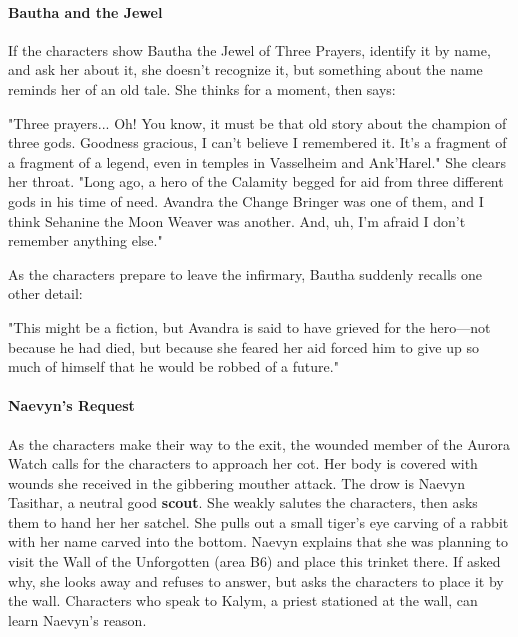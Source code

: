 \documentclass[10pt,a4,twoside,twocolumn,openany,nodeprecatedcode]{dndbook}
\begin{document}
\paragraph{Bautha and the Jewel}
If the characters show Bautha the Jewel of Three Prayers, identify it by name, and ask her about it, she doesn't recognize it, but something about the name reminds her of an old tale. She thinks for a moment, then says:
\begin{DndReadAloud}{}
"Three prayers... Oh! You know, it must be that old story about the champion of three gods. Goodness gracious, I can't believe I remembered it. It's a fragment of a fragment of a legend, even in temples in Vasselheim and Ank'Harel." She clears her throat. "Long ago, a hero of the Calamity begged for aid from three different gods in his time of need. Avandra the Change Bringer was one of them, and I think Sehanine the Moon Weaver was another. And, uh, I'm afraid I don't remember anything else."
\end{DndReadAloud}

As the characters prepare to leave the infirmary, Bautha suddenly recalls one other detail:
\begin{DndReadAloud}{}
"This might be a fiction, but Avandra is said to have grieved for the hero—not because he had died, but because she feared her aid forced him to give up so much of himself that he would be robbed of a future."
\end{DndReadAloud}

\paragraph{Naevyn's Request}
As the characters make their way to the exit, the wounded member of the Aurora Watch calls for the characters to approach her cot. Her body is covered with wounds she received in the gibbering mouther attack.
The drow is Naevyn Tasithar, a neutral good \textbf{scout}. She weakly salutes the characters, then asks them to hand her her satchel. She pulls out a small tiger's eye carving of a rabbit with her name carved into the bottom. Naevyn explains that she was planning to visit the Wall of the Unforgotten (area B6) and place this trinket there. If asked why, she looks away and refuses to answer, but asks the characters to place it by the wall. Characters who speak to Kalym, a priest stationed at the wall, can learn Naevyn's reason.
\end{document}
